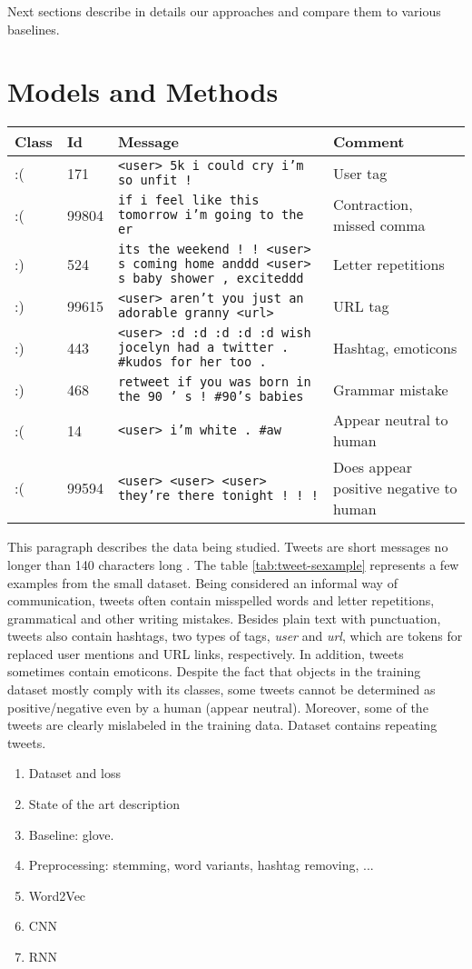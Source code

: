 \documentclass[10pt,conference,compsocconf]{IEEEtran}
\begin{document}
Next sections describe in details our approaches and compare them to various baselines.
\section{Models and Methods}
\begin{table*}[htbp]
	\centering
	\begin{tabular}[c]{|l|l|l|l|}
		\hline
		Class&Id&Message&Comment\\
		\hline
		:( & 171 & {\tt <user> 5k i could cry i'm so unfit !} & User tag\\\hline
		:( & 99804 & {\tt if i feel like this tomorrow i'm going to the er } & Contraction, missed comma\\\hline
		:) & 524 & {\tt its the weekend ! ! <user> s coming home anddd <user> s baby shower , exciteddd } & Letter repetitions\\\hline
		:) & 99615 & {\tt <user> aren't you just an adorable granny <url> } & URL tag\\\hline
		:) & 443 & {\tt <user> :d :d :d :d :d wish jocelyn had a twitter . \#kudos for her too . } & Hashtag, emoticons \\\hline
		:) & 468 & {\tt retweet if you was born in the 90 ' s ! \#90's babies } & Grammar mistake\\\hline
		:( & 14 & {\tt <user> i'm white . \#aw } & Appear neutral to human \\\hline
		:( & 99594 & {\tt <user> <user> <user> they're there tonight ! ! ! } & Does appear positive negative to human \\\hline
	\end{tabular}
	\caption{Examples of tweets in the small dataset}
	\label{tab:tweet-sexample}
\end{table*}

This paragraph describes the data being studied.
Tweets are short messages no longer than 140 characters long \cite{twitter}.
The table \ref{tab:tweet-sexample} represents a few examples from the small dataset.
Being considered an informal way of communication, tweets often contain misspelled words and letter repetitions, grammatical and other writing mistakes.
Besides plain text with punctuation, tweets also contain hashtags, two types of tags, {\em user} and {\em url}, which are tokens for replaced user mentions and URL links, respectively.
In addition, tweets sometimes contain emoticons.
Despite the fact that objects in the training dataset mostly comply with its classes, some tweets cannot be determined as positive/negative even by a human (appear neutral).
Moreover, some of the tweets are clearly mislabeled in the training data.
Dataset contains repeating tweets.
\begin{enumerate}
\item Dataset and loss
\item State of the art description
\item Baseline: glove.
\item Preprocessing: stemming, word variants, hashtag removing, ...
\item Word2Vec
\item CNN
\item RNN
\end{enumerate}
\end{document}
